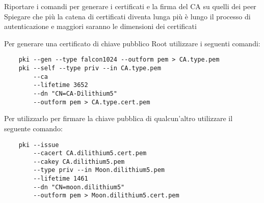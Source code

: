 Riportare i comandi per generare i certificati e la firma del CA su quelli dei peer
Spiegare che più la catena di certificati diventa lunga più è lungo il processo di autenticazione
e maggiori saranno le dimensioni dei certificati


Per generare una certificato di chiave pubblico Root utilizzare i seguenti comandi:
\begin{lstlisting}
    pki --gen --type falcon1024 --outform pem > CA.type.pem 
    pki --self --type priv --in CA.type.pem 
        --ca 
        --lifetime 3652 
        --dn "CN=CA-Dilithium5"
        --outform pem > CA.type.cert.pem
\end{lstlisting}

Per utilizzarlo per firmare la chiave pubblica di qualcun'altro utilizzare il 
seguente comando:
\begin{lstlisting}
    pki --issue 
        --cacert CA.dilithium5.cert.pem 
        --cakey CA.dilithium5.pem 
        --type priv --in Moon.dilithium5.pem 
        --lifetime 1461 
        --dn "CN=moon.dilithium5"
        --outform pem > Moon.dilithium5.cert.pem
\end{lstlisting}

